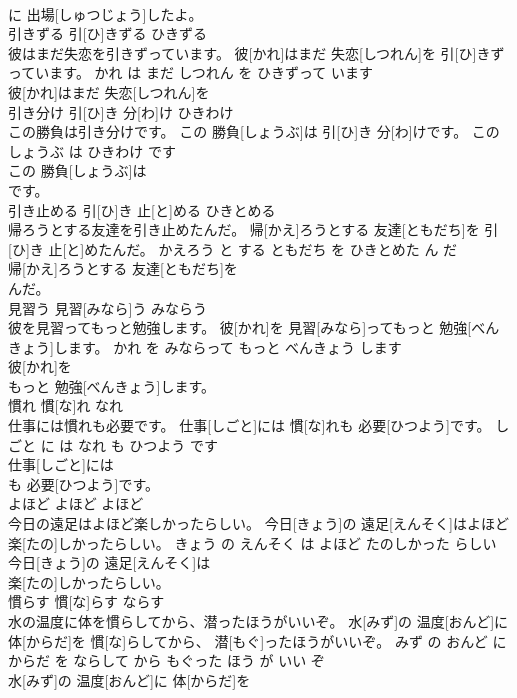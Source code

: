 \documentclass[8pt]{extreport}
\begin{document}
\begin{CJK}{UTF8}{min}
\\	に 出場[しゅつじょう]したよ。			
\\	引きずる	引[ひ]きずる	ひきずる	
\\	彼はまだ失恋を引きずっています。	彼[かれ]はまだ 失恋[しつれん]を 引[ひ]きずっています。	かれ は まだ しつれん を ひきずって います	
\\	彼[かれ]はまだ 失恋[しつれん]を
\\	引き分け	引[ひ]き 分[わ]け	ひきわけ	
\\	この勝負は引き分けです。	この 勝負[しょうぶ]は 引[ひ]き 分[わ]けです。	この しょうぶ は ひきわけ です	
\\	この 勝負[しょうぶ]は
\\	です。			
\\	引き止める	引[ひ]き 止[と]める	ひきとめる	
\\	帰ろうとする友達を引き止めたんだ。	帰[かえ]ろうとする 友達[ともだち]を 引[ひ]き 止[と]めたんだ。	かえろう と する ともだち を ひきとめた ん だ	
\\	帰[かえ]ろうとする 友達[ともだち]を
\\	んだ。			
\\	見習う	見習[みなら]う	みならう	
\\	彼を見習ってもっと勉強します。	彼[かれ]を 見習[みなら]ってもっと 勉強[べんきょう]します。	かれ を みならって もっと べんきょう します	
\\	彼[かれ]を
\\	もっと 勉強[べんきょう]します。			
\\	慣れ	慣[な]れ	なれ	
\\	仕事には慣れも必要です。	仕事[しごと]には 慣[な]れも 必要[ひつよう]です。	しごと に は なれ も ひつよう です	
\\	仕事[しごと]には
\\	も 必要[ひつよう]です。			
\\	よほど	よほど	よほど	
\\	今日の遠足はよほど楽しかったらしい。	今日[きょう]の 遠足[えんそく]はよほど 楽[たの]しかったらしい。	きょう の えんそく は よほど たのしかった らしい	
\\	今日[きょう]の 遠足[えんそく]は
\\	楽[たの]しかったらしい。			
\\	慣らす	慣[な]らす	ならす	
\\	水の温度に体を慣らしてから、潜ったほうがいいぞ。	水[みず]の 温度[おんど]に 体[からだ]を 慣[な]らしてから、 潜[もぐ]ったほうがいいぞ。	みず の おんど に からだ を ならして から もぐった ほう が いい ぞ	
\\	水[みず]の 温度[おんど]に 体[からだ]を

\end{CJK}
\end{document}
